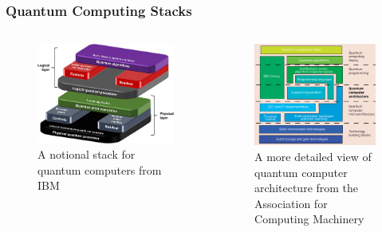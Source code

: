 \documentclass[handout]{beamer}
\begin{document}
\begin{frame}
  \frametitle{Quantum Computing Stacks}

  \begin{columns}
    \begin{figure}
      \centering
      \includegraphics[width=0.95\linewidth]{Graphics/QComp-Stack-Nature.jpg}
      \caption{A notional stack for quantum computers from
        IBM~\cite{SC-QComp-stack}}   
    \end{figure}
    
    \begin{figure}
      \centering
      \includegraphics[width=0.95\linewidth]{Graphics/ACM-QComp-stack.png}
      \caption{A more detailed view of quantum computer architecture from
        the Association for Computing Machinery~\cite{acm-qcomp-blueprint}}
    \end{figure}
    
  \end{columns}
  
\end{frame}
\end{document}
